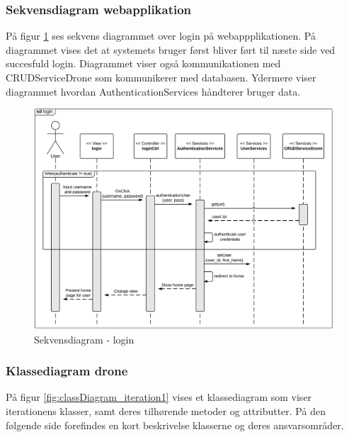 \newpage

\subsubsection*{Sekvensdiagram webapplikation}
På figur \ref{fig:Sekvens_diagram_login} ses sekvens diagrammet over login på webappplikationen. På diagrammet vises det at systemets bruger først bliver ført til næste side ved succesfuld login. Diagrammet viser også kommunikationen med CRUDServiceDrone som kommunikerer med databasen. Ydermere viser diagrammet hvordan AuthenticationServices håndterer bruger data.

\begin{figure}[H]
	\centering
	\includegraphics[width=1\textwidth]{Billeder/sekvens/login_sq_diagram.png}
	\caption{Sekvensdiagram - login}
	\label{fig:Sekvens_diagram_login}
\end{figure}
\newpage


\subsubsection*{Klassediagram drone}
\vspace{-0.2cm}
På figur \ref{fig:classDiagram_iteration1} vises et klassediagram som viser iterationens klasser, samt deres tilhørende metoder og attributter. På den følgende side forefindes en kort beskrivelse klasserne og deres ansvarsområder.

